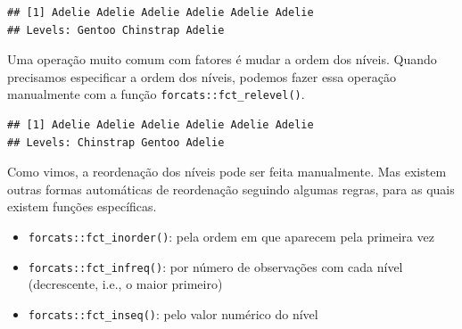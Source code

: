 \documentclass[
]{article}
\newenvironment{Shaded}{\begin{snugshade}}{\end{snugshade}}
\newcommand{\DocumentationTok}[1]{\textcolor[rgb]{0.56,0.35,0.01}{\textbf{\textit{#1}}}}
\newcommand{\FunctionTok}[1]{\textcolor[rgb]{0.13,0.29,0.53}{\textbf{#1}}}
\newcommand{\NormalTok}[1]{#1}
\newcommand{\SpecialCharTok}[1]{\textcolor[rgb]{0.81,0.36,0.00}{\textbf{#1}}}
\newcommand{\StringTok}[1]{\textcolor[rgb]{0.31,0.60,0.02}{#1}}
\providecommand{\tightlist}{%
  \setlength{\itemsep}{0pt}\setlength{\parskip}{0pt}}
\begin{document}
\begin{Shaded}
\end{Shaded}

\begin{verbatim}
## [1] Adelie Adelie Adelie Adelie Adelie Adelie
## Levels: Gentoo Chinstrap Adelie
\end{verbatim}

Uma operação muito comum com fatores é mudar a ordem dos níveis. Quando precisamos especificar a ordem dos níveis, podemos fazer essa operação manualmente com a função \texttt{forcats::fct\_relevel()}.

\begin{Shaded}
\end{Shaded}

\begin{verbatim}
## [1] Adelie Adelie Adelie Adelie Adelie Adelie
## Levels: Chinstrap Gentoo Adelie
\end{verbatim}

Como vimos, a reordenação dos níveis pode ser feita manualmente. Mas existem outras formas automáticas de reordenação seguindo algumas regras, para as quais existem funções específicas.

\begin{itemize}
\tightlist
\item
  \texttt{forcats::fct\_inorder()}: pela ordem em que aparecem pela primeira vez
\item
  \texttt{forcats::fct\_infreq()}: por número de observações com cada nível (decrescente, i.e., o maior primeiro)
\item
  \texttt{forcats::fct\_inseq()}: pelo valor numérico do nível
\end{itemize}
\end{document}
